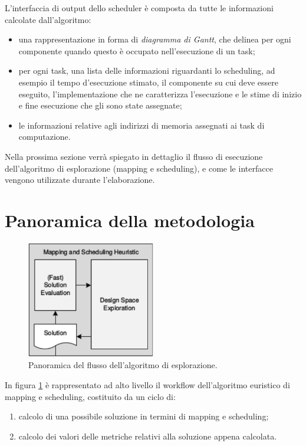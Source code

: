 L'interfaccia di output dello scheduler è composta da tutte le informazioni
calcolate dall'algoritmo:
\begin{itemize}
 \item una rappresentazione in forma di \emph{diagramma di Gantt}, che delinea 
per ogni componente quando questo è occupato nell'esecuzione di un task;
 \item per ogni task, una lista delle informazioni riguardanti lo scheduling, 
ad esempio il tempo d'esecuzione stimato, il componente su cui deve essere 
eseguito, l'implementazione che ne caratterizza l'esecuzione e le stime di 
inizio e fine esecuzione che gli sono state assegnate;
 \item le informazioni relative agli indirizzi di memoria assegnati ai task
 di computazione.
\end{itemize}

Nella prossima sezione verrà spiegato in dettaglio il flusso di 
esecuzione dell'algoritmo di esplorazione (mapping e scheduling), e come le
interfacce vengono utilizzate durante l'elaborazione.


\section{Panoramica della metodologia}
\label{sec:panoramicaMetodologia}

\begin{figure}[t]
  \begin{center}
    \includegraphics[width=0.5\textwidth]{./capitoli/figure/cap4/Methodology.pdf}
    \caption{Panoramica del flusso dell'algoritmo di esplorazione.}
    \label{fig:mapperWorkflow}
  \end{center}
\end{figure}

In figura \ref{fig:mapperWorkflow} \`e rappresentato ad alto livello il workflow
dell'algoritmo euristico di mapping e scheduling, costituito da un ciclo di:
\begin{enumerate}
  \item calcolo di una possibile soluzione in termini di mapping e scheduling;
  \item calcolo dei valori delle metriche relativi alla soluzione appena calcolata.
\end{enumerate}

